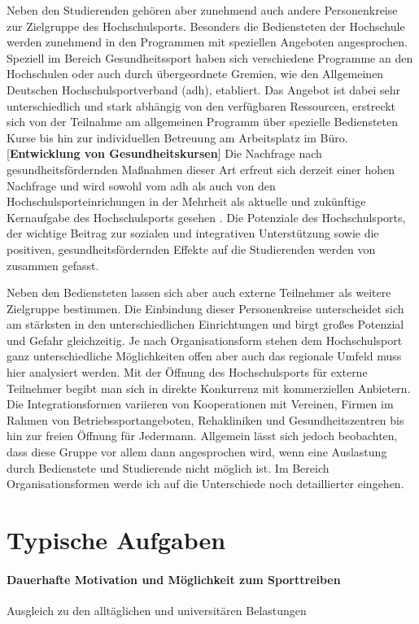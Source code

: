Neben den Studierenden gehören aber zunehmend auch andere Personenkreise zur Zielgruppe des Hochschulsports. Besonders die Bediensteten der Hochschule werden zunehmend in den Programmen mit speziellen Angeboten angesprochen. Speziell im Bereich Gesundheitssport haben sich verschiedene Programme an den Hochschulen oder auch durch übergeordnete Gremien, wie den Allgemeinen Deutschen Hochschulsportverband (adh), etabliert. Das Angebot ist dabei sehr unterschiedlich und stark abhängig von den verfügbaren Ressourcen, erstreckt sich von der Teilnahme am allgemeinen Programm über spezielle Bediensteten Kurse bis hin zur individuellen Betreuung am Arbeitsplatz im Büro. [\textbf{Entwicklung von Gesundheitskursen}] Die Nachfrage nach gesundheitsfördernden Maßnahmen dieser Art erfreut sich derzeit einer hohen Nachfrage und wird sowohl vom adh als auch von den Hochschulsporteinrichungen in der Mehrheit als aktuelle und zukünftige Kernaufgabe des Hochschulsports gesehen \cite[vgl.][]{Baumgarten.2009}.
Die Potenziale des Hochschulsports, der wichtige Beitrag zur sozialen und integrativen Unterstützung sowie die positiven, gesundheitsfördernden Effekte auf die Studierenden werden von \cite{Goring.2010} zusammen gefasst. 

Neben den Bediensteten lassen sich aber auch externe Teilnehmer als weitere Zielgruppe bestimmen. Die Einbindung dieser Personenkreise unterscheidet sich am stärksten in den unterschiedlichen Einrichtungen und birgt großes Potenzial und Gefahr gleichzeitig. Je nach Organisationsform stehen dem Hochschulsport ganz unterschiedliche Möglichkeiten offen aber auch das regionale Umfeld muss hier analysiert werden. Mit der Öffnung des Hochschulsports für externe Teilnehmer begibt man sich in direkte Konkurrenz mit kommerziellen Anbietern. Die Integrationsformen variieren von Kooperationen mit Vereinen, Firmen im Rahmen von Betriebssportangeboten, Rehakliniken und Gesundheitszentren bis hin zur freien Öffnung für Jedermann. Allgemein lässt sich jedoch beobachten, dass diese Gruppe vor allem dann angesprochen wird, wenn eine Auslastung durch Bedienstete und Studierende nicht möglich ist. Im Bereich Organisationsformen werde ich auf die Unterschiede noch detaillierter eingehen.  
\section{Typische Aufgaben}
\paragraph*{Dauerhafte Motivation und Möglichkeit zum Sporttreiben} Ausgleich zu den alltäglichen und universitären Belastungen
